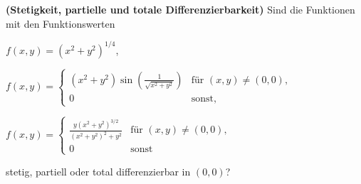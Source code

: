 \begin{Problem}
	\textbf{(Stetigkeit, partielle und totale Differenzierbarkeit)}	Sind die Funktionen mit den Funktionswerten
	\begin{parts}
		\item $f(x,y)=(x^2+y^2)^{1 / 4}$,
		\item $f(x,y)=\begin{cases}
				(x^2+y^2)\sin\left( \frac{1}{\sqrt{x^2+y^2} } \right) & \text{f\"{u}r }(x,y)\neq (0,0),\\
				0 & \text{sonst,}
		\end{cases}$ 
	\item $f(x,y)=\begin{cases}
			\frac{y(x^2+y^2)^{3 / 2}}{(x^2+y^2)^2+y^2} & \text{f\"{u}r }(x,y)\neq (0,0),\\
			0 & \text{sonst}
	\end{cases}$
	\end{parts}
	stetig, partiell oder total differenzierbar in $(0,0)$?
\end{Problem}
